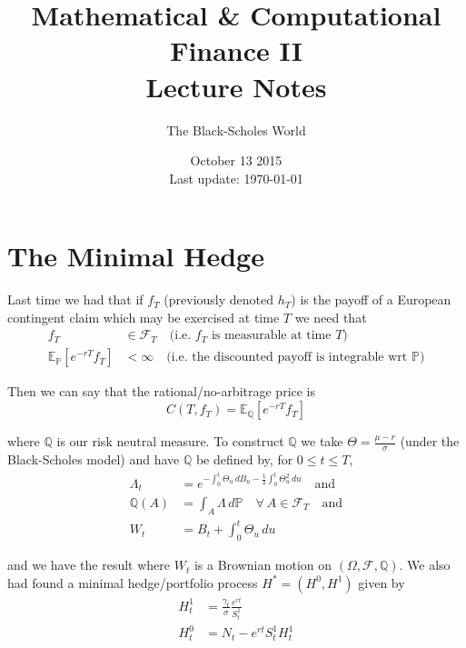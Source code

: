 \documentclass[12pt]{article}
\newlength\tindent
\renewcommand{\indent}{\hspace*{\tindent}}
\begin{document}
 
 
\title{Mathematical \& Computational Finance II\\Lecture Notes}
\author{The Black-Scholes World}
\date{October 13 2015 \\ Last update: \today{}}
\maketitle

\section{The Minimal Hedge}

\indent Last time we had that if $f_T$ (previously denoted $h_T$) is the payoff of a European contingent claim which may be exercised at time $T$ we need that
\begin{align*}
	f_T &\in \mathcal F_T \quad \text{(i.e. $f_T$ is measurable at time $T$)} \\
	\mathbb E_{\mathbb P}[e^{-rT}f_T] &< \infty \quad \text{(i.e. the discounted payoff is integrable wrt $\mathbb P$)}
\end{align*}

Then we can say that the rational/no-arbitrage price is
\begin{equation*}
	C(T,f_T) = \mathbb E_{\mathbb Q}[e^{-rT}f_T]
\end{equation*}

where $\mathbb Q$ is our risk neutral measure. To construct $\mathbb Q$ we take $\Theta = \frac{\mu - r}{\sigma}$ (under the Black-Scholes model) and have $\mathbb Q$ be defined by, for $0 \leq t \leq T$,
\begin{align*}
	\Lambda_t &= e^{-\int^t_0\Theta_u\,dB_u - \frac{1}{2}\int^t_0\Theta^2_u\,du} \quad \text{and} \\
	\mathbb Q(A) &= \int_A \Lambda\,d\mathbb P \quad \forall~A\in\mathcal F_T \quad \text{and} \\
	W_t &= B_t + \int^t_0\Theta_u\,du
\end{align*}

and we have the result where $W_t$ is a Brownian motion on $(\Omega,\mathcal F,\mathbb Q)$. We also had found a minimal hedge/portfolio process $H^* = (H^0,H^1)$ given by
\begin{align*}
	H^1_t &= \frac{\gamma_t}{\sigma}\frac{e^{rt}}{S^1_t} \\
	H^0_t &= N_t - e^{rt}S^1_tH^1_t
\end{align*}
\end{document}
